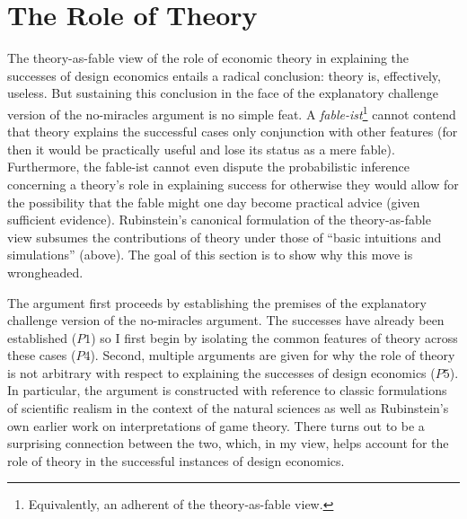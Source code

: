 \section{The Role of Theory}\label{fable_sec_theory}

The theory-as-fable view of the role of economic theory in explaining the successes of design economics entails a radical conclusion: theory is, effectively, useless. But sustaining this conclusion in the face of the explanatory challenge version of the no-miracles argument is no simple feat. A \textit{fable-ist}\footnote{Equivalently, an adherent of the theory-as-fable view.} cannot contend that theory explains the successful cases only conjunction with other features (for then it would be practically useful and lose its status as a mere fable). Furthermore, the fable-ist cannot even dispute the probabilistic inference concerning a theory's role in explaining success for otherwise they would allow for the possibility that the fable might one day become practical advice (given sufficient evidence). Rubinstein's \autocite*{rubinstein2012} canonical formulation of the theory-as-fable view subsumes the contributions of theory under those of ``basic intuitions and simulations'' (above). The goal of this section is to show why this move is wrongheaded.

The argument first proceeds by establishing the premises of the explanatory challenge version of the no-miracles argument. The successes have already been established ($P1$) so I first begin by isolating the common features of theory across these cases ($P4$). Second, multiple arguments are given for why the role of theory is not arbitrary with respect to explaining the successes of design economics ($P5$). In particular, the argument is constructed with reference to classic formulations of scientific realism in the context of the natural sciences as well as Rubinstein's own earlier work on interpretations of game theory. There turns out to be a surprising connection between the two, which, in my view, helps account for the role of theory in the successful instances of design economics. 

